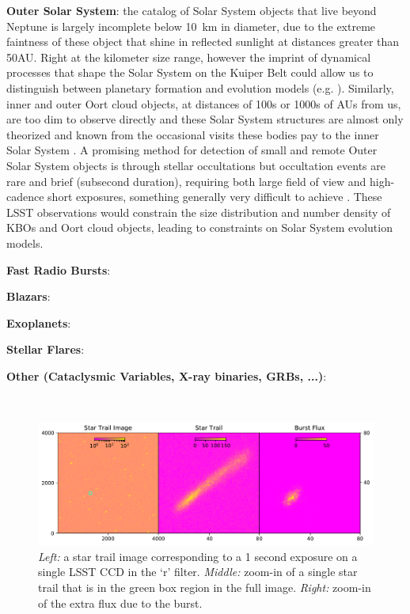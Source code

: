 \documentclass[12pt, letterpaper]{article}
\begin{document}
{\bf Outer Solar System}: the catalog of Solar System objects that live beyond Neptune is largely incomplete below 10~km in diameter, due to the extreme faintness of these object that shine in reflected sunlight at distances greater than 50AU. Right at the kilometer size range, however the imprint of dynamical processes that shape the Solar System on the Kuiper Belt could allow us to distinguish between planetary formation and evolution models (e.g. \citealt{Kenyon04}). Similarly, inner and outer Oort cloud objects, at distances of 100s or 1000s of AUs from us, are too dim to observe directly and these Solar System structures are almost only theorized and known from the occasional visits these bodies pay to the inner Solar System \citep{Levison07}. A promising method for detection of small and remote Outer Solar System objects is through stellar occultations \citep{Nihei07, Schlichting12}
 but occultation events are rare and brief (subsecond duration), requiring both large field of view and high-cadence short exposures, something generally very difficult to achieve \citep{Bianco09}. These LSST observations would constrain the size distribution and number density of KBOs and Oort cloud objects, leading to constraints on Solar System evolution models.

{\color{green}

{\bf Fast Radio Bursts}: 

{\bf Blazars}: 

{\bf Exoplanets}: 

{\bf Stellar Flares}: 

{\bf Other (Cataclysmic Variables, X-ray binaries, GRBs, ...)}: 

}
\
\begin{figure}[htb]
\center
\includegraphics[width=1.00\columnwidth]{star_trail.pdf}
\caption{\textit{Left:} a star trail image corresponding to a 1 second exposure on a single LSST CCD in the `r' filter. \textit{Middle:} zoom-in of a single star trail that is in the green box region in the full image. \textit{Right:} zoom-in of the extra flux due to the burst.}
\label{fig:trail}
\end{figure}
\end{document}
